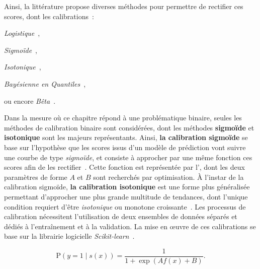 Ainsi, la littérature propose diverses méthodes pour permettre de rectifier ces scores, dont les calibrations~:
\begin{inlinerate}
    \item \textit{Logistique}~\cite{Friedman2000},
    \item \textit{Sigmoïde}~\cite{Platt2000,kull2017b},
    \item \textit{Isotonique}~\cite{Zadrozny2002},
    \item \textit{Bayésienne en Quantiles}~\cite{Naeini2015},
    \item ou encore \textit{Bêta}~\cite{Kull2017}.
\end{inlinerate} Dans la mesure où ce chapitre répond à une problématique binaire, seules les méthodes de calibration binaire sont considérées, dont les méthodes \textbf{sigmoïde} et \textbf{isotonique} sont les majeurs représentants. Ainsi, \textbf{la calibration sigmoïde} se base sur l'hypothèse que les scores issus d'un modèle de prédiction vont suivre une courbe de type \textit{sigmoïde}, et consiste à approcher par une même fonction ces scores afin de les rectifier~\cite{NiculescuMizil2005}. Cette fonction est représentée par l', dont les deux paramètres de forme $A$ et $B$ sont recherchés par optimisation. À l'instar de la calibration sigmoïde, \textbf{la calibration isotonique} est une forme plus généralisée permettant d'approcher une plus grande multitude de tendances, dont l'unique condition requiert d'être \textit{isotonique} ou monotone croissante~\cite{NiculescuMizil2005}. Les processus de calibration nécessitent l'utilisation de deux ensembles de données séparés et dédiés à l'entraînement et à la validation. La mise en œuvre de ces calibrations se base sur la librairie logicielle \textit{Scikit-learn}~\cite{pedregosa2011}.\par

\begin{equation}
    \mathrm{P}(y=1 \mid s(x))=\frac{1}{1+\exp (A f(x)+B)}.
    \label{eq:sigmoid_calibration}
\end{equation}

\clearpage

